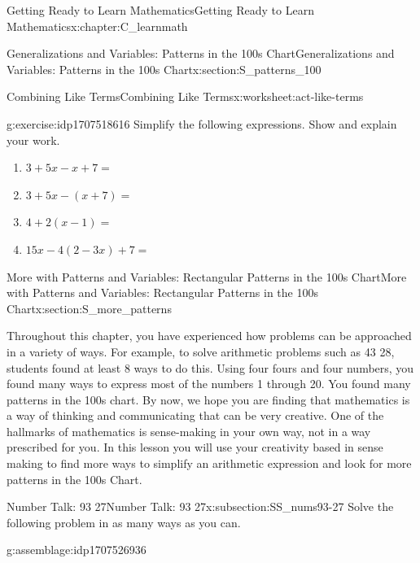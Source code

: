 \documentclass[oneside,10pt,]{book}
\numberwithin{equation}{chapter}
\begin{document}
\begin{chapterptx}{Getting Ready to Learn Mathematics}{}{Getting Ready to Learn Mathematics}{}{}{x:chapter:C_learnmath}
\begin{sectionptx}{Generalizations and Variables: Patterns in the 100s Chart}{}{Generalizations and Variables: Patterns in the 100s Chart}{}{}{x:section:S_patterns_100}
\begin{worksheet-subsection}{Combining Like Terms}{}{Combining Like Terms}{}{}{x:worksheet:act-like-terms}
\begin{divisionexercise}{5}{}{}{g:exercise:idp1707518616}%
Simplify the following expressions. Show and explain your work.%
\begin{enumerate}[font=\bfseries,label=(\alph*),ref=\alph*]
\item{}\(3 + 5x - x + 7 =\)%
\item{}\(3 + 5x - (x + 7) =\)%
\item{}\(4 + 2(x - 1) =\)%
\item{}\(15x - 4(2 - 3x) + 7 =\)%
\end{enumerate}
\end{divisionexercise}%
\end{worksheet-subsection}
\restoregeometry
\end{sectionptx}
%
%
\typeout{************************************************}
\typeout{************************************************}
%
\begin{sectionptx}{More with Patterns and Variables: Rectangular Patterns in the 100s Chart}{}{More with Patterns and Variables: Rectangular Patterns in the 100s Chart}{}{}{x:section:S_more_patterns}
\begin{introduction}{}%
Throughout this chapter, you have experienced how problems can be approached in a variety of ways. For example, to solve arithmetic problems such as 43 \textminus{} 28, students found at least 8 ways to do this. Using four fours and four numbers, you found many ways to express most of the numbers 1 through 20. You found many patterns in the 100s chart. By now, we hope you are finding that mathematics is a way of thinking and communicating that can be very creative. One of the hallmarks of mathematics is sense-making in your own way, not in a way prescribed for you. In this lesson you will use your creativity based in sense making to find more ways to simplify an arithmetic expression and look for more patterns in the 100s Chart.%
\end{introduction}%
%
%
\typeout{************************************************}
\typeout{************************************************}
%
\begin{subsectionptx}{Number Talk: 93 \textminus{} 27}{}{Number Talk: 93 \textminus{} 27}{}{}{x:subsection:SS_nums93-27}
Solve the following problem in as many ways as you can.%
\begin{assemblage}{}{g:assemblage:idp1707526936}%

\end{assemblage}
\end{subsectionptx}
\end{sectionptx}
\end{chapterptx}
\end{document}

